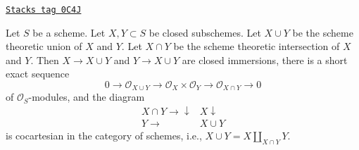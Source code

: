 \begin{lemma}
\label{morphisms-lemma-scheme-theoretic-union}
\href{https://stacks.math.columbia.edu/tag/0C4J}{\texttt{Stacks tag 0C4J}}

Let $S$ be a scheme. Let $X, Y \subset S$ be closed subschemes.
Let $X \cup Y$ be the scheme theoretic union of $X$ and $Y$.
Let $X \cap Y$ be the scheme theoretic intersection of $X$ and $Y$.
Then $X \to X \cup Y$ and $Y \to X \cup Y$ are closed immersions, there is a
short exact sequence
$$
0 \to \mathcal{O}_{X \cup Y} \to \mathcal{O}_X \times \mathcal{O}_Y
\to \mathcal{O}_{X \cap Y} \to 0
$$
of $\mathcal{O}_S$-modules, and the diagram
$$
\begin{array}{cc}X \cap Y \longrightarrow\downarrow & X \downarrow \\ Y \longrightarrow & X \cup Y\end{array}
$$
is cocartesian in the category of schemes, i.e.,
$X \cup Y = X \amalg_{X \cap Y} Y$.
\end{lemma}


